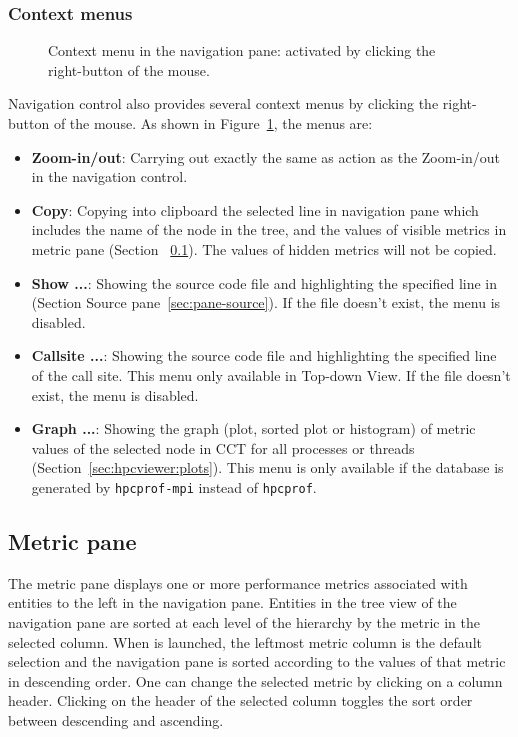 \subsubsection{Context menus}
\begin{figure}
\caption{Context menu in the navigation pane: activated by clicking the right-button of the mouse.}
\label{fig:hpcviewer-menu-context}
\end{figure}
Navigation control also provides several context menus by clicking the right-button of the mouse. As shown in Figure~\ref{fig:hpcviewer-menu-context}, the menus are:
\begin{itemize}
 \item \textbf{Zoom-in/out}: Carrying out exactly the same as action as the Zoom-in/out in the navigation control.
 \item \textbf{Copy}: Copying into clipboard the selected line in navigation pane which includes the name of the node in the tree, and the values of visible metrics in metric pane (Section ~\ref{sec:pane-metric}). The values of hidden metrics will not be copied.
 \item \textbf{Show ...}: Showing the source code file and highlighting the specified line in (Section Source pane~\ref{sec:pane-source}). If the file doesn't exist, the menu is disabled.
 \item \textbf{Callsite ...}: Showing the source code file and highlighting the specified line of the call site. This menu only available in Top-down View. If the file doesn't exist, the menu is disabled.
 \item \textbf{Graph ...}: Showing the graph (plot, sorted plot or histogram) of metric values of the selected node in CCT for all processes or threads (Section~\ref{sec:hpcviewer:plots}). This menu is only available if the database is generated by \texttt{hpcprof-mpi} instead of \texttt{hpcprof}. 
\end{itemize}



\subsection{Metric pane}
\label{sec:pane-metric}

The metric pane displays one or more performance metrics associated with entities to the left in the navigation pane.
Entities in the tree view of the navigation pane are sorted at each level of the hierarchy by the metric in the selected column.
When \hpcviewer{} is launched, the leftmost metric column is the default selection and the navigation pane is sorted according to the values of that metric in descending order.
One can change the selected metric by clicking on a column header.
Clicking on the header of the selected column toggles the sort order between descending and ascending.

